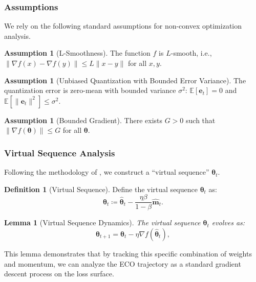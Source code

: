 \documentclass[11pt, a4paper, onecolumn, copyright, goog]{google}
\newcommand{\methodname}{ECO}
\newcommand{\vect}[1]{\mathbf{#1}}
\newcommand{\vtheta}{\boldsymbol{\theta}}
\newcommand{\vm}{\vect{m}}
\newcommand{\ve}{\vect{e}}
\newcommand{\E}{\mathbb{E}}
\theoremstyle{plain}
\newtheorem{lemma}[theorem]{Lemma}
\theoremstyle{definition}
\newtheorem{definition}[theorem]{Definition}
\newtheorem{assumption}[theorem]{Assumption}
\theoremstyle{remark}
\begin{document}
\subsubsection{Assumptions}

We rely on the following standard assumptions for non-convex optimization analysis.

\begin{assumption}[L-Smoothness]
The function $f$ is $L$-smooth, i.e., $\|\nabla f(x) - \nabla f(y)\| \le L \|x-y\|$ for all $x, y$.
\end{assumption}

\begin{assumption}[Unbiased Quantization with Bounded Error Variance]
The quantization error is zero-mean with bounded variance $\sigma^2$: $\E[\ve_t] = 0$ and $\E[\|\ve_t\|^2] \le \sigma^2$.
\end{assumption}

\begin{assumption}[Bounded Gradient]
There exists $G > 0$ such that $\|\nabla f(\vtheta)\| \le G$ for all $\vtheta$.
\end{assumption}

\subsubsection{Virtual Sequence Analysis}

Following the methodology of \citet{ef21}, we construct a ``virtual sequence'' $\vtheta_t$.

\begin{definition}[Virtual Sequence]
Define the virtual sequence $\vtheta_t$ as:
\begin{equation}
\vtheta_t \coloneqq \hat{\vtheta}_t - \frac{\eta \beta}{1-\beta} \hat{\vm}_t.
\end{equation}
\end{definition}

\begin{lemma}[Virtual Sequence Dynamics]
\label{lemma:virtual_dynamics}
The virtual sequence $\vtheta_t$ evolves as:
\begin{equation}
    \vtheta_{t+1} = \vtheta_t - \eta \nabla f(\hat{\vtheta}_t),
\end{equation}
\end{lemma}
This lemma demonstrates that by tracking this specific combination of weights and momentum, we can analyze the \methodname{} trajectory as a standard gradient descent process on the loss surface.
\end{document}
